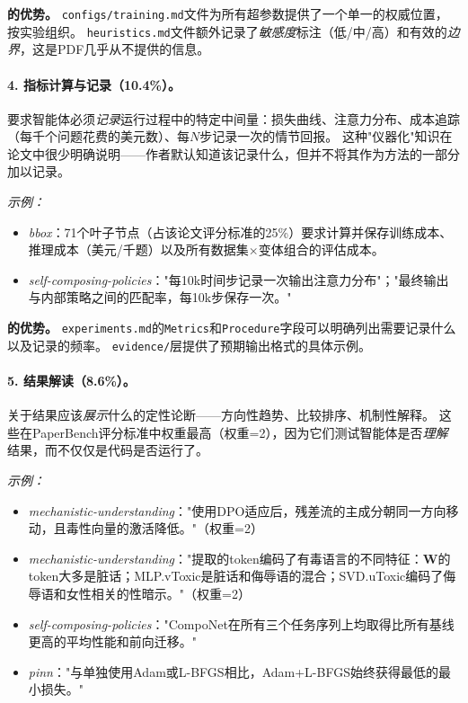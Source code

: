 \noindent\textbf{\ara{}的优势。}
\texttt{configs/training.md}文件为所有超参数提供了一个单一的权威位置，按实验组织。
\texttt{heuristics.md}文件额外记录了\emph{敏感度}标注（低/中/高）和有效的\emph{边界}，这是PDF几乎从不提供的信息。

\paragraph{4. 指标计算与记录（10.4\%）。}
要求智能体必须\emph{记录}运行过程中的特定中间量：损失曲线、注意力分布、成本追踪（每千个问题花费的美元数）、每$N$步记录一次的情节回报。
这种"仪器化"知识在论文中很少明确说明——作者默认知道该记录什么，但并不将其作为方法的一部分加以记录。

\emph{示例：}
\begin{itemize}[leftmargin=*, itemsep=1pt]
  \item \emph{bbox}：71个叶子节点（占该论文评分标准的25\%）要求计算并保存训练成本、推理成本（美元/千题）以及所有数据集$\times$变体组合的评估成本。
  \item \emph{self-composing-policies}："每10k时间步记录一次输出注意力分布"；"最终输出与内部策略之间的匹配率，每10k步保存一次。"
\end{itemize}

\noindent\textbf{\ara{}的优势。}
\texttt{experiments.md}的\texttt{Metrics}和\texttt{Procedure}字段可以明确列出需要记录什么以及记录的频率。
\texttt{evidence/}层提供了预期输出格式的具体示例。

\paragraph{5. 结果解读（8.6\%）。}
关于结果应该\emph{展示}什么的定性论断——方向性趋势、比较排序、机制性解释。
这些在PaperBench评分标准中权重最高（权重=2），因为它们测试智能体是否\emph{理解}结果，而不仅仅是代码是否运行了。

\emph{示例：}
\begin{itemize}[leftmargin=*, itemsep=1pt]
  \item \emph{mechanistic-understanding}："使用DPO适应后，残差流的主成分朝同一方向移动，且毒性向量的激活降低。"（权重=2）
  \item \emph{mechanistic-understanding}："提取的token编码了有毒语言的不同特征：$\mathbf{W}$的token大多是脏话；MLP.vToxic是脏话和侮辱语的混合；SVD.uToxic编码了侮辱语和女性相关的性暗示。"（权重=2）
  \item \emph{self-composing-policies}："CompoNet在所有三个任务序列上均取得比所有基线更高的平均性能和前向迁移。"
  \item \emph{pinn}："与单独使用Adam或L-BFGS相比，Adam+L-BFGS始终获得最低的最小损失。"
\end{itemize}

